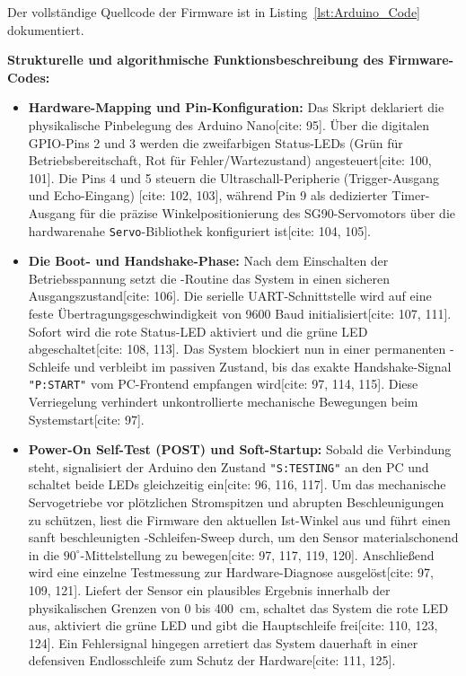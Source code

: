 Der vollständige Quellcode der Firmware ist in Listing~\ref{lst:Arduino_Code} dokumentiert.

\begin{center}
	\label{code:UltraschallradarArduino}  
\end{center}

\bigskip
\noindent
\textbf{Strukturelle und algorithmische Funktionsbeschreibung des Firmware-Codes:}

\begin{itemize}
	\item \textbf{Hardware-Mapping und Pin-Konfiguration:} Das Skript deklariert die physikalische Pinbelegung des Arduino Nano[cite: 95]. Über die digitalen GPIO-Pins 2 und 3 werden die zweifarbigen Status-LEDs (Grün für Betriebsbereitschaft, Rot für Fehler/Wartezustand) angesteuert[cite: 100, 101]. Die Pins 4 und 5 steuern die Ultraschall-Peripherie (Trigger-Ausgang und Echo-Eingang) [cite: 102, 103], während Pin 9 als dedizierter Timer-Ausgang für die präzise Winkelpositionierung des SG90-Servomotors über die hardwarenahe \texttt{Servo}-Bibliothek konfiguriert ist[cite: 104, 105].
	\item \textbf{Die Boot- und Handshake-Phase:} Nach dem Einschalten der Betriebsspannung setzt die -Routine das System in einen sicheren Ausgangszustand[cite: 106]. Die serielle UART-Schnittstelle wird auf eine feste Übertragungsgeschwindigkeit von 9600 Baud initialisiert[cite: 107, 111]. Sofort wird die rote Status-LED aktiviert und die grüne LED abgeschaltet[cite: 108, 113]. Das System blockiert nun in einer permanenten -Schleife und verbleibt im passiven Zustand, bis das exakte Handshake-Signal \texttt{"P:START"} vom PC-Frontend empfangen wird[cite: 97, 114, 115]. Diese Verriegelung verhindert unkontrollierte mechanische Bewegungen beim Systemstart[cite: 97].
	\item \textbf{Power-On Self-Test (POST) und Soft-Startup:} Sobald die Verbindung steht, signalisiert der Arduino den Zustand \texttt{"S:TESTING"} an den PC und schaltet beide LEDs gleichzeitig ein[cite: 96, 116, 117]. Um das mechanische Servogetriebe vor plötzlichen Stromspitzen und abrupten Beschleunigungen zu schützen, liest die Firmware den aktuellen Ist-Winkel aus und führt einen sanft beschleunigten -Schleifen-Sweep durch, um den Sensor materialschonend in die $90^\circ$-Mittelstellung zu bewegen[cite: 97, 117, 119, 120]. Anschließend wird eine einzelne Testmessung zur Hardware-Diagnose ausgelöst[cite: 97, 109, 121]. Liefert der Sensor ein plausibles Ergebnis innerhalb der physikalischen Grenzen von 0 bis 400~cm, schaltet das System die rote LED aus, aktiviert die grüne LED und gibt die Hauptschleife frei[cite: 110, 123, 124]. Ein Fehlersignal hingegen arretiert das System dauerhaft in einer defensiven Endlosschleife zum Schutz der Hardware[cite: 111, 125].

\end{itemize}
